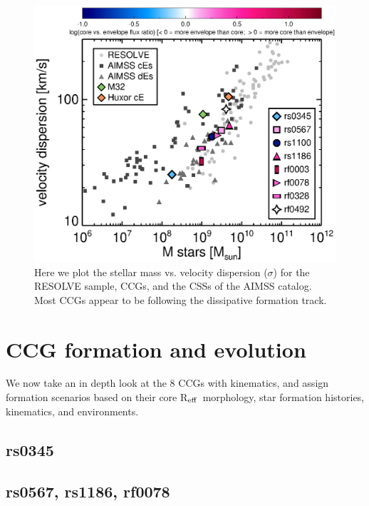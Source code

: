 \documentclass[iop,apj]{emulateapj}
\newcommand{\Reff}{R$_{\rm eff}$}
\begin{document}
\begin{figure}[b]
\begin{center}
\includegraphics{faber-jackson_resolvesigmas.eps}
\caption{Here we plot the stellar mass vs. velocity dispersion ($\sigma$) for the RESOLVE sample, CCGs, and the CSSs of the AIMSS catalog. Most CCGs appear to be following the dissipative formation track.}
\label{fig:sigma}
\end{center}
\end{figure}

\section{CCG formation and evolution} %
\label{discussion}

We now take an in depth look at the 8 CCGs with kinematics, and assign formation scenarios based on their core \Reff\, morphology, star formation histories, kinematics, and environments.

\subsection{rs0345}

\subsection{rs0567, rs1186, rf0078}
\end{document}
